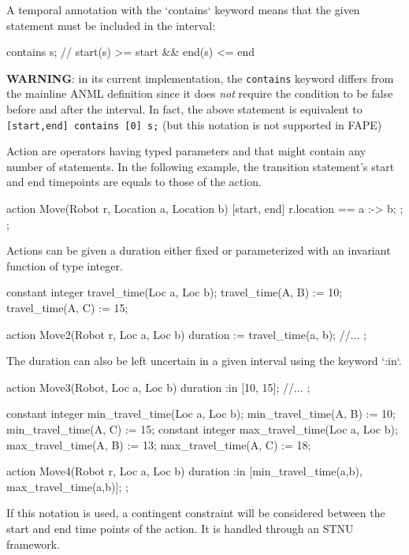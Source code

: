 A temporal annotation with the `contains` keyword means that the given
statement must be included in the interval:
\begin{anmlcode}
 contains s;
// start(s) >= start && end(s) <= end
\end{anmlcode}
  
{\bf WARNING}: in its current implementation, the \lstinline!contains! keyword differs from the mainline ANML definition since it does \emph{not} require the condition to be false before and after the interval.
In fact, the above statement is equivalent to \lstinline![start,end] contains [0] s;! (but this notation is not supported in FAPE)



Action are operators having typed parameters and that might contain any number
of statements. In the following example, the transition statement's start and
end timepoints are equals to those of the action.
\begin{anmlcode}
action Move(Robot r, Location a, Location b) {
  [start, end] {
    r.location == a :-> b;
  };
};
\end{anmlcode}


Actions can be given a duration either fixed or parameterized with an invariant function of type integer.
\begin{anmlcode}
constant integer travel_time(Loc a, Loc b);
travel_time(A, B) := 10;
travel_time(A, C) := 15;

action Move2(Robot r, Loc a, Loc b) {
  duration := travel_time(a, b);
  //...
};
\end{anmlcode}
    
The duration can also be left uncertain in a given interval using the keyword `:in`.

\begin{anmlcode}
action Move3(Robot, Loc a, Loc b) {
  duration :in [10, 15];
  //...
};

constant integer min_travel_time(Loc a, Loc b);
min_travel_time(A, B) := 10;
min_travel_time(A, C) := 15;
constant integer max_travel_time(Loc a, Loc b);
max_travel_time(A, B) := 13;
max_travel_time(A, C) := 18;

action Move4(Robot r, Loc a, Loc b) {
  duration :in [min_travel_time(a,b), max_travel_time(a,b)];
};
\end{anmlcode}

If this notation is used, a contingent constraint will be considered between the start and end time points of the action.
It is handled through an STNU framework.

